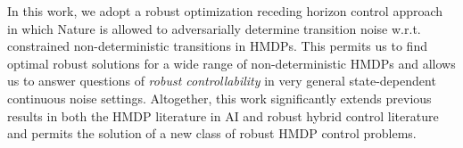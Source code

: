 In this work, we adopt a robust optimization receding horizon control
approach in which Nature is allowed to adversarially determine
transition noise w.r.t. constrained non-deterministic transitions in HMDPs.
This permits us to find optimal robust solutions for a wide range of
non-deterministic HMDPs and allows us to answer questions of \emph{robust
controllability} in very general state-dependent continuous noise settings.
Altogether, this work significantly extends previous results in both
the HMDP literature in AI and robust hybrid control literature
and permits the solution of a new class of robust HMDP control problems.


